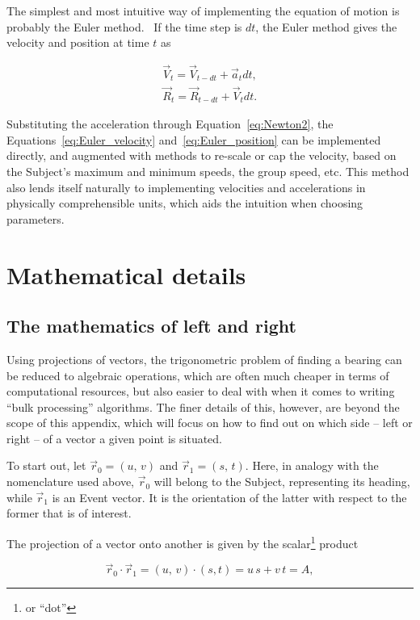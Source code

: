 \documentclass[]{article} %
\begin{document}
The simplest and most intuitive way of implementing the equation of motion is probably the Euler method.~\cite{Beta}
If the time step is $dt$, the Euler method gives the velocity and position at time $t$ as

\begin{eqnarray}
 \label{eq:Euler_velocity}
 \vec{V}_t = \vec{V}_{t-dt} + \vec{a}_t dt, \\
 \label{eq:Euler_position}
 \vec{R}_t = \vec{R}_{t-dt} + \vec{V}_t dt. 
\end{eqnarray}

Substituting the acceleration through Equation~\eqref{eq:Newton2}, the Equations~\eqref{eq:Euler_velocity} and~\eqref{eq:Euler_position} can be implemented directly, and augmented with methods to re-scale or cap the velocity, based on the Subject's maximum and minimum speeds, the group speed, etc.
This method also lends itself naturally to implementing velocities and accelerations in physically comprehensible units, which aids the intuition when choosing parameters.


\appendix
\section{Mathematical details}
\label{sec:mathematics}
\subsection{The mathematics of left and right}
\label{sec:left_and_right}
Using projections of vectors, the trigonometric problem of finding a bearing can be reduced to algebraic operations, which are often much cheaper in terms of computational resources, but also easier to deal with when it comes to writing ``bulk processing'' algorithms.
The finer details of this, however, are beyond the scope of this appendix, which will focus on how to find out on which side -- left or right -- of a vector a given point is situated.

To start out, let $\vec{r}_0 = \left(u,\, v\right)$ and $\vec{r}_1 = \left(s,\, t\right)$.
Here, in analogy with the nomenclature used above, $\vec{r}_0$ will belong to the Subject, representing its heading, while $\vec{r}_1$ is an Event vector.
It is the orientation of the latter with respect to the former that is of interest.

The projection of a vector onto another is given by the scalar\footnote{or ``dot''} product~\cite{Beta}

\begin{equation}
\vec{r}_0 \cdot \vec{r}_1 = \left(u,\, v\right) \cdot \left(s, t\right) = u\,s + v\,t = A,
\end{equation}
\end{document}
